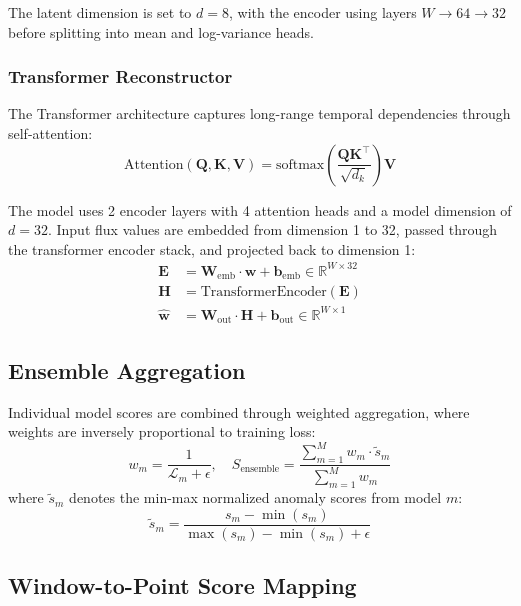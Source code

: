 \documentclass[conference]{IEEEtran}
\begin{document}
The latent dimension is set to $d=8$, with the encoder using layers $W \to 64 \to 32$ before splitting into mean and log-variance heads.

\subsubsection{Transformer Reconstructor}
The Transformer architecture captures long-range temporal dependencies through self-attention:
\begin{equation}
\text{Attention}(\mathbf{Q}, \mathbf{K}, \mathbf{V}) = \text{softmax}\left(\frac{\mathbf{Q}\mathbf{K}^\top}{\sqrt{d_k}}\right)\mathbf{V}
\end{equation}

The model uses 2 encoder layers with 4 attention heads and a model dimension of $d=32$. Input flux values are embedded from dimension 1 to 32, passed through the transformer encoder stack, and projected back to dimension 1:
\begin{align}
\mathbf{E} &= \mathbf{W}_{\text{emb}} \cdot \mathbf{w} + \mathbf{b}_{\text{emb}} \in \mathbb{R}^{W \times 32} \\
\mathbf{H} &= \text{TransformerEncoder}(\mathbf{E}) \\
\hat{\mathbf{w}} &= \mathbf{W}_{\text{out}} \cdot \mathbf{H} + \mathbf{b}_{\text{out}} \in \mathbb{R}^{W \times 1}
\end{align}

\subsection{Ensemble Aggregation}

Individual model scores are combined through weighted aggregation, where weights are inversely proportional to training loss:
\begin{equation}
w_m = \frac{1}{\mathcal{L}_m + \epsilon}, \quad S_{\text{ensemble}} = \frac{\sum_{m=1}^{M} w_m \cdot \tilde{s}_m}{\sum_{m=1}^{M} w_m}
\end{equation}
where $\tilde{s}_m$ denotes the min-max normalized anomaly scores from model $m$:
\begin{equation}
\tilde{s}_m = \frac{s_m - \min(s_m)}{\max(s_m) - \min(s_m) + \epsilon}
\end{equation}

\subsection{Window-to-Point Score Mapping}
\end{document}

